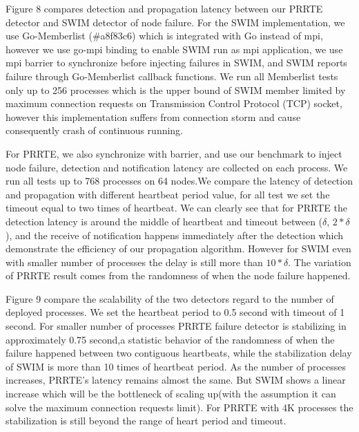 \documentclass[sigconf]{acmart}
\begin{document}
Figure 8 compares detection and propagation latency between our PRRTE detector and SWIM detector of node failure. For the SWIM implementation, we use Go-Memberlist (\#a8f83c6) which is integrated with Go instead of mpi, however we use go-mpi binding to enable SWIM run as mpi application, we use mpi barrier to synchronize before injecting failures in SWIM, and SWIM reports failure through Go-Memberlist callback functions. We run all Memberlist tests only up to 256 processes which is the upper bound of SWIM member limited by maximum connection requests on Transmission Control Protocol (TCP) socket, however this implementation suffers from connection storm and cause consequently crash of continuous running. 

For PRRTE, we also synchronize with barrier, and use our benchmark to inject node failure, detection and notification latency are collected on each process. We run all tests up to 768 processes on 64 nodes.We compare the latency of detection and propagation with different heartbeat period value, for all test we set the timeout equal to two times of heartbeat. We can clearly see that for PRRTE the detection latency is around the middle of heartbeat and timeout between ($\delta$, $2*\delta$), and the receive of notification happens immediately after the detection which demonstrate the efficiency of our propagation algorithm. However for SWIM even with smaller number of processes the delay is still more than $10*\delta$. The variation of PRRTE result comes from the randomness of when the node failure happened.

Figure 9 compare the scalability of the two detectors regard to the number of deployed processes. We set the heartbeat period to 0.5 second with timeout of 1 second. For smaller number of processes PRRTE failure detector is stabilizing in approximately 0.75 second,a statistic behavior of the randomness of when the failure happened between two contiguous heartbeats, while the stabilization delay of SWIM is more than 10 times of heartbeat period. As the number of processes increases, PRRTE's latency remains almost the same. But SWIM shows a linear increase which will be the bottleneck of scaling up(with the assumption it can solve the maximum connection requests limit). For PRRTE with 4K processes the stabilization is still beyond the range of heart period and timeout.
\end{document}
